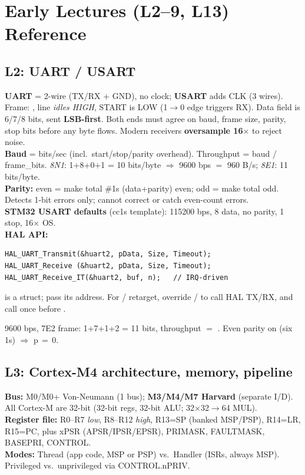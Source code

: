 \section{Early Lectures (L2--9, L13) Reference}

\subsection{L2: UART / USART}
\textbf{UART} = 2-wire (TX/RX + GND), no clock; \textbf{USART} adds CLK (3 wires). Frame: , line \emph{idles HIGH}, START is LOW (1$\to$0 edge triggers RX). Data field is 6/7/8 bits, sent \textbf{LSB-first}. Both ends must agree on baud, frame size, parity, stop bits before any byte flows. Modern receivers \textbf{oversample 16$\times$} to reject noise.\\
\textbf{Baud} = bits/sec (incl.\ start/stop/parity overhead). Throughput = baud / frame\_bits. \emph{8N1}: 1+8+0+1 = 10 bits/byte $\Rightarrow$ 9600 bps $=$ 960 B/s; \emph{8E1}: 11 bits/byte.\\
\textbf{Parity:} even = make total \#1s (data+parity) even; odd = make total odd. Detects 1-bit errors only; cannot correct or catch even-count errors.\\
\textbf{STM32 USART defaults} (cc1s template): 115200 bps, 8 data, no parity, 1 stop, 16$\times$ OS.\\
\textbf{HAL API:}
\begin{lstlisting}[language={}]
HAL_UART_Transmit(&huart2, pData, Size, Timeout);
HAL_UART_Receive (&huart2, pData, Size, Timeout);
HAL_UART_Receive_IT(&huart2, buf, n);   // IRQ-driven
\end{lstlisting}
 is a  struct; pass its address. For / retarget, override  /  to call HAL TX/RX, and call  once before .
\begin{ex}
9600 bps, 7E2 frame: 1+7+1+2 = 11 bits, throughput $=$ . Even parity on  (six 1s) $\Rightarrow$ p\,$=$\,0.
\end{ex}

\subsection{L3: Cortex-M4 architecture, memory, pipeline}
\textbf{Bus:} M0/M0+ Von-Neumann (1 bus); \textbf{M3/M4/M7 Harvard} (separate I/D). All Cortex-M are 32-bit (32-bit regs, 32-bit ALU; 32$\times$32$\to$64 MUL). \\
\textbf{Register file:} R0--R7 \emph{low}, R8--R12 \emph{high}, R13=SP (banked MSP/PSP), R14=LR, R15=PC, plus xPSR (APSR/IPSR/EPSR), PRIMASK, FAULTMASK, BASEPRI, CONTROL.\\
\textbf{Modes:} Thread (app code, MSP or PSP) vs.\ Handler (ISRs, always MSP). Privileged vs.\ unprivileged via CONTROL.nPRIV.

